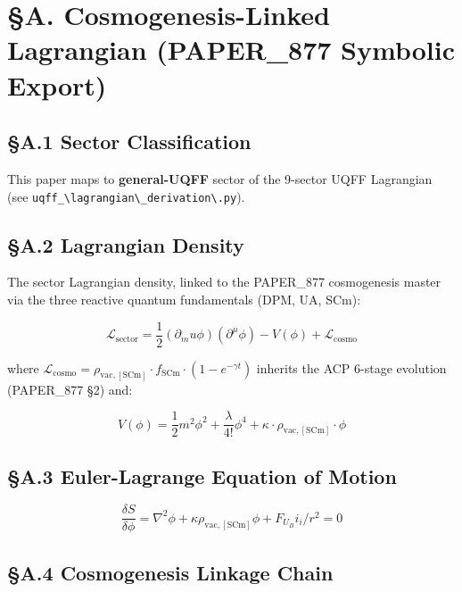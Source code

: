\documentclass[12pt,a4paper]{article}
\begin{document}
\section{\S{}A. Cosmogenesis-Linked Lagrangian (PAPER\_877 Symbolic Export)}

\subsection{\S{}A.1 Sector Classification}

This paper maps to \textbf{general-UQFF} sector of the 9-sector UQFF Lagrangian (see \texttt{uqff\_\textbackslash {lagrangian\textbackslash \_derivation\textbackslash }.py}).

\subsection{\S{}A.2 Lagrangian Density}

The sector Lagrangian density, linked to the PAPER\_877 cosmogenesis master via the three reactive quantum fundamentals (DPM, UA, SCm):

\begin{equation}
\mathcal{L}_{\mathrm{sector}} = \frac{1}{2}(\partial_mu \phi)(\partial^\mu \phi) - V(\phi) + \mathcal{L}_{\mathrm{cosmo}}
\end{equation}

where $\mathcal{L}_{\mathrm{cosmo}} = \rho_{\mathrm{vac,[SCm]}} \cdot f_{\mathrm{SCm}} \cdot (1 - e^{-\gamma t})$ inherits the ACP 6-stage evolution (PAPER\_877 \S{}2) and:

\begin{equation}
V(\phi) = \frac{1}{2} m^2 \phi^2 + \frac{\lambda}{4!} \phi^4 + \kappa \cdot \rho_{\mathrm{vac,[SCm]}} \cdot \phi
\end{equation}

\subsection{\S{}A.3 Euler-Lagrange Equation of Motion}

\begin{equation}
\boxed{\frac{\delta S}{\delta \phi} = \nabla^2 \phi + \kappa \rho_{\mathrm{vac,[SCm]}} \phi + F_U_Bi_i/r^2 = 0}
\end{equation}

\subsection{\S{}A.4 Cosmogenesis Linkage Chain}
\end{document}
